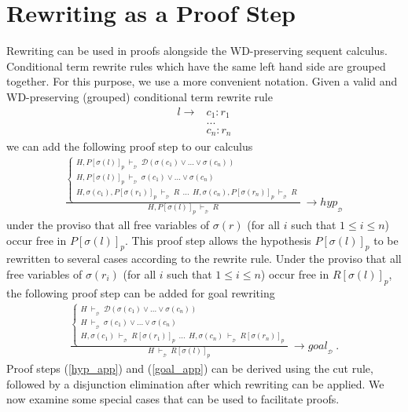 \documentclass[copyright]{eptcs}
\begin{document}
\section{Rewriting as a Proof Step}\label{pstep}
Rewriting can be used in proofs alongside the WD-preserving sequent calculus. Conditional term rewrite rules which have the same left hand side are grouped together. For this purpose, we use a more convenient notation. Given a valid and WD-preserving (grouped) conditional term rewrite rule
\begin{eqnarray*}
l \rightarrow &c_1: r_1\\
&...\\
&c_n: r_n
\end{eqnarray*}
we can add the following proof step to our calculus
\begin{eqnarray}
\frac
	{\left\{
	\begin{array}{l}
	H, P[\sigma(l)]_p~\vdash_{_\mathcal{D}}~\mathcal{D}(\sigma(c_1)\lor ...\lor \sigma(c_n)) \\
	H, P[\sigma(l)]_p~\vdash_{_\mathcal{D}}~\sigma(c_1)\lor ...\lor \sigma(c_n) \\
	H, \sigma(c_1), P[\sigma(r_1)]_p~\vdash_{_\mathcal{D}}~R~~...~~H, \sigma(c_n), P[\sigma(r_n)]_p~\vdash_{_\mathcal{D}}~R
	\end{array}\right.
	}
	{H, P[\sigma(l)]_p~\vdash_{_\mathcal{D}}~R}~\rightarrow hyp_{_\mathcal{D}}\label{hyp_app}
\end{eqnarray}
under the proviso that all free variables of $\sigma(r)$ (for all $i$ such that $1 \leq i \leq n$) occur free in $P[\sigma(l)]_p$. This proof step allows the hypothesis $P[\sigma(l)]_p$ to be rewritten to several cases according to the rewrite rule.
Under the proviso that all free variables of $\sigma(r_i)$ (for all $i$ such that $1 \leq i \leq n$) occur free in $R[\sigma(l)]_p$, the following proof step can be added for goal rewriting
\begin{eqnarray}
\frac
	{\left\{
	\begin{array}{l}
	H~\vdash_{_\mathcal{D}}~\mathcal{D}(\sigma(c_1)\lor ...\lor \sigma(c_n)) \\
	H~\vdash_{_\mathcal{D}}~\sigma(c_1)\lor ...\lor \sigma(c_n) \\
	H, \sigma(c_1)~\vdash_{_\mathcal{D}}~R[\sigma(r_1)]_p~~...~~H, \sigma(c_n)~\vdash_{_\mathcal{D}}~R[\sigma(r_n)]_p
	\end{array}\right.
	}
	{H~\vdash_{_\mathcal{D}}~R[\sigma(l)]_p}~\rightarrow goal_{_\mathcal{D}}~.\label{goal_app}
\end{eqnarray}
Proof steps (\ref{hyp_app}) and (\ref{goal_app}) can be derived using the cut rule, followed by a disjunction elimination after which rewriting can be applied. We now examine some special cases that can be used to facilitate proofs.
\end{document}
